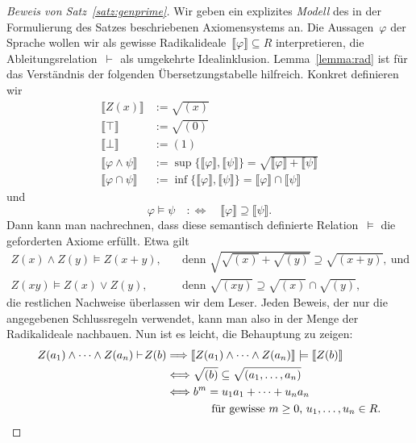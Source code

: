 \documentclass[a4paper,ngerman,12pt]{scrartcl}
\theoremstyle{definition}
\theoremstyle{plain}
\theoremstyle{remark}
\newcommand{\brak}[1]{\llbracket {#1} \rrbracket}
\newcommand{\seq}[1]{\mathrel{\vdash\!\!\!_{#1}}}
\renewcommand{\_}{\mathpunct{.}\,}
\newcommand{\?}{\,{:}\,}
\begin{document}
\begin{proof}[Beweis von Satz~\ref{satz:genprime}]
Wir geben ein explizites \emph{Modell} des in der Formulierung des Satzes
beschriebenen Axiomensystems an. Die Aussagen~$\varphi$ der Sprache wollen wir als
gewisse Radikalideale~$\brak{\varphi} \subseteq R$ interpretieren, die
Ableitungsrelation~$\seq{}$ als umgekehrte Idealinklusion.
Lemma~\ref{lemma:rad} ist für das Verständnis der folgenden Übersetzungstabelle
hilfreich. Konkret definieren wir
\begin{align*}
  \brak{Z(x)} &:= \sqrt{(x)} \\
  \brak{\top} &:= \sqrt{(0)} \\
  \brak{\bot} &:= (1) \\
  \brak{\varphi \wedge \psi} &:= \sup\{\brak{\varphi},\brak{\psi}\} = \sqrt{\brak{\varphi} + \brak{\psi}} \\
  \brak{\varphi \cap \psi} &:= \inf\{\brak{\varphi},\brak{\psi}\} = \brak{\varphi} \cap \brak{\psi}
\end{align*}
und
\[ \varphi \models \psi \quad:\Longleftrightarrow\quad
  \brak{\varphi} \supseteq \brak{\psi}. \]
Dann kann man nachrechnen, dass diese semantisch definierte Relation~$\models$
die geforderten Axiome erfüllt. Etwa gilt
\begin{align*}
  Z(x) \wedge Z(y) \models Z(x+y), &
    \quad\text{denn } \sqrt{\sqrt{(x)} + \sqrt{(y)}} \supseteq \sqrt{(x+y)},\ \text{und} \\
  Z(xy) \models Z(x) \vee Z(y), &
    \quad\text{denn } \sqrt{(xy)} \supseteq \sqrt{(x)} \cap \sqrt{(y)},
\end{align*}
die restlichen Nachweise überlassen wir dem Leser. Jeden Beweis, der nur die
angegebenen Schlussregeln verwendet, kann man also in der Menge der
Radikalideale nachbauen. Nun ist es leicht, die Behauptung zu zeigen:
\begin{align*}
  Z(a_1) \wedge \cdots \wedge Z(a_n) \seq{} Z(b)
  &\Longrightarrow
  \brak{Z(a_1) \wedge \cdots \wedge Z(a_n)} \models \brak{Z(b)} \\
  &\Longleftrightarrow
  \sqrt{(b)} \subseteq \sqrt{(a_1,\ldots,a_n)} \\
  &\Longleftrightarrow
  b^m = u_1 a_1 + \cdots + u_n a_n \\
  &\qquad\qquad
    \text{für gewisse~$m \geq 0$, $u_1,\ldots,u_n \in R$.} \qedhere
\end{align*}
\end{proof}

\end{document}
